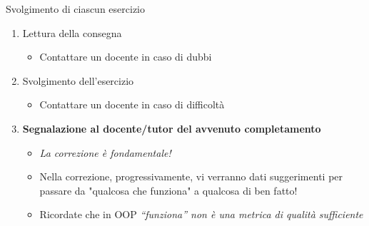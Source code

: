 \documentclass[xcolor=dvipsnames,presentation]{beamer}
\begin{document}
\begin{frame}{Svolgimento di ciascun esercizio}
    \begin{enumerate}\itemsep20pt
        \item Lettura della consegna
        \begin{itemize}
            \item Contattare un docente in caso di dubbi
        \end{itemize}
        \item Svolgimento dell'esercizio
        \begin{itemize}
            \item Contattare un docente in caso di difficoltà
        \end{itemize}
        \item \textbf{Segnalazione al docente/tutor del avvenuto completamento}
        \begin{itemize}
            \item \textit{La correzione è fondamentale!}
            \item Nella correzione, progressivamente, vi verranno dati suggerimenti per passare da "qualcosa che funziona"
            a qualcosa di ben fatto!
            \item Ricordate che in OOP \textit{``funziona'' non è una metrica di qualità sufficiente}
        \end{itemize}
    \end{enumerate}
\end{frame}
\end{document}
